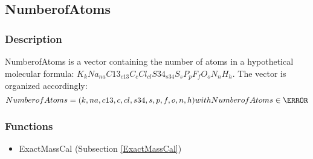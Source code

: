 \subsection{NumberofAtoms}\label{NumberofAtoms}
\subsubsection{Description}

NumberofAtoms is a vector containing the number of atoms in a hypothetical molecular formula: $ K_{k} Na_{na} C13_{c13} C_{c} Cl_{cl} S34_{s34} S_{s} P_{p} F_{f} O_{o} N_{n} H_{h} $. The vector is organized accordingly: 
\begin{equation}

NumberofAtoms=(k,na,c13,c,cl,s34,s,p,f,o,n,h) with NumberofAtoms \in \N


\end{equation}

\subsubsection{Functions}
\begin{itemize}
\item ExactMassCal (Subsection \ref{ExactMassCal})
\end{itemize}

